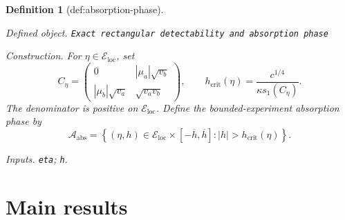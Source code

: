 \documentclass{article}
\newtheorem{definition}{Definition}
\begin{document}
\begin{definition}[def:absorption-phase]\label{def:absorption-phase}
\par\smallskip\noindent\emph{Defined object.} \texttt{Exact rectangular detectability and absorption phase}
\par\smallskip\noindent\emph{Construction.} For \(\eta\in\mathcal E_{\mathrm{loc}}\), set
\[
C_\eta=
\begin{pmatrix}
0&|\mu_a|\sqrt{v_b}\\
|\mu_b|\sqrt{v_a}&\sqrt{v_av_b}
\end{pmatrix},
\qquad
h_{\mathrm{crit}}(\eta)
=\frac{c^{1/4}}{\kappa s_1(C_\eta)}.
\]
The denominator is positive on \(\mathcal E_{\mathrm{loc}}\).  Define the bounded-experiment absorption phase by
\[
\mathcal A_{\mathrm{abs}}
=\left\{(\eta,h)\in\mathcal E_{\mathrm{loc}}\times[-\overline h,\overline h]:
|h|>h_{\mathrm{crit}}(\eta)\right\}.
\]
\par\smallskip\noindent\emph{Inputs.} \texttt{eta}; \texttt{h}.
\end{definition}

\section{Main results}
\end{document}

